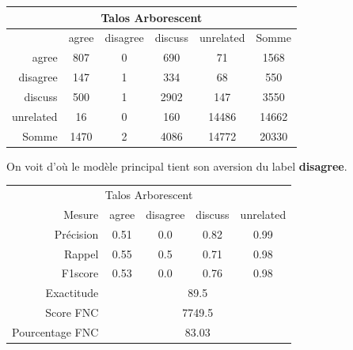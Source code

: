 \documentclass[11pt,a4paper,oldfontcommands]{memoir}
\begin{document}
\begin{center}
 \begin{tabular}{ r | c c c c | c }
  \multicolumn{6}{c}{Talos Arborescent}                      \\
  \hline
            & agree & disagree & discuss & unrelated & Somme \\
  \hline
  agree     & 807   & 0        & 690     & 71        & 1568  \\
  disagree  & 147   & 1        & 334     & 68        & 550   \\
  discuss   & 500   & 1        & 2902    & 147       & 3550  \\
  unrelated & 16    & 0        & 160     & 14486     & 14662 \\
  \hline
  Somme     & 1470  & 2        & 4086    & 14772     & 20330 \\
 \end{tabular}
\end{center}



On voit d'où le modèle principal tient son aversion du label \textbf{disagree}.

\begin{center}
 \begin{tabular}{ r | c c c c }
  \multicolumn{5}{c}{Talos Arborescent}                                         \\
  Mesure          & agree                      & disagree & discuss & unrelated \\
  \hline
  Précision       & 0.51                       & 0.0      & 0.82    & 0.99      \\
  Rappel          & 0.55                       & 0.5      & 0.71    & 0.98      \\
  F1score         & 0.53                       & 0.0      & 0.76    & 0.98      \\
  \hline
  \hline
  Exactitude      & \multicolumn{4}{c}{89.5}                                    \\
  Score FNC       & \multicolumn{4}{c}{7749.5}                                  \\
  Pourcentage FNC & \multicolumn{4}{c}{83.03}                                   \\
 \end{tabular}
\end{center}
\end{document}
